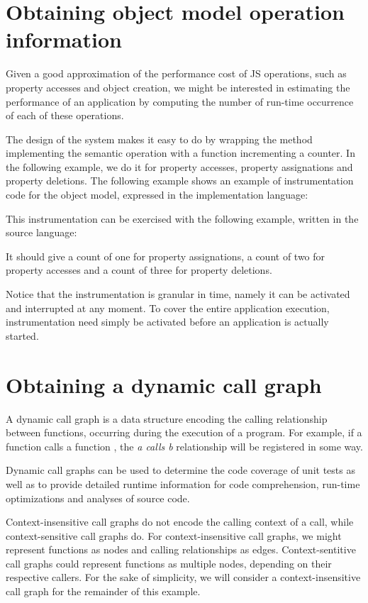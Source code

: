 \section{Obtaining object model operation information}

Given a good approximation of the performance cost of JS operations, such as
property accesses and object creation, we might be interested in estimating the
performance of an application by computing the number of run-time occurrence of
each of these operations.

The design of the system makes it easy to do by wrapping the method
implementing the semantic operation with a function incrementing a counter.  In
the following example, we do it for property accesses, property assignations
and property deletions. The following example shows an example of
instrumentation code for the object model, expressed in the
implementation language:


This instrumentation can be exercised with the following example, written in
the source language:


It should give a count of one for property assignations, a count of two for
property accesses and a count of three for property deletions.

Notice that the instrumentation is granular in time, namely it can be activated
and interrupted at any moment.  To cover the entire application execution,
instrumentation need simply be activated before an application is actually
started. 

\section{Obtaining a dynamic call graph}

A dynamic call graph is a data structure encoding the calling relationship
between functions, occurring during the execution of a program. For example, if
a function  calls a function , the \textit{a calls b} relationship
will be registered in some way. 

Dynamic call graphs can be used to determine the code coverage of unit tests as
well as to provide detailed runtime information for code comprehension,
run-time optimizations and analyses of source code. 

Context-insensitive call graphs do not encode the calling context of a call,
while context-sensitive call graphs do. For context-insensitive call graphs, we
might represent functions as nodes and calling relationships as edges.
Context-sentitive call graphs could represent functions as multiple nodes,
depending on their respective callers. For the sake of simplicity, we will
consider a context-insensitive call graph for the remainder of this example. 

